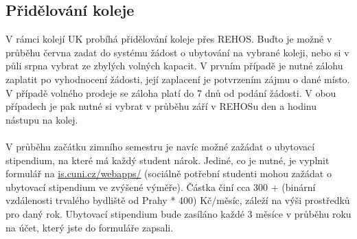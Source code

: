 \subsection{Přidělování koleje}
V rámci kolejí UK probíhá přidělování koleje přes REHOS. Buďto je možné v
průběhu června zadat do systému žádost o ubytování na vybrané koleji, nebo si v
půli srpna vybrat ze zbylých volných kapacit. V prvním případě je nutné zálohu
zaplatit po vyhodnocení žádosti, její zaplacení je potvrzením zájmu o dané
místo. V případě volného prodeje se záloha platí do 7 dnů od podání žádosti. V
obou případech je pak nutné si vybrat v průběhu září v REHOSu den a hodinu
nástupu na kolej.
\\\\
V průběhu začátku zimního semestru je navíc možné zažádat o ubytovací
stipendium, na které má každý student nárok. Jediné, co je nutné, je vyplnit
formulář na \url{is.cuni.cz/webapps/} (sociálně potřební studenti mohou
zažádat o ubytovací stipendium ve zvýšené výměře). Částka činí cca 300 +
(binární vzdálenosti trvalého bydliště od Prahy * 400) Kč/měsíc, záleží na výši
prostředků pro daný rok. Ubytovací stipendium bude zasíláno každé 3 měsíce v
průběhu roku na účet, který jste do formuláře zapsali.